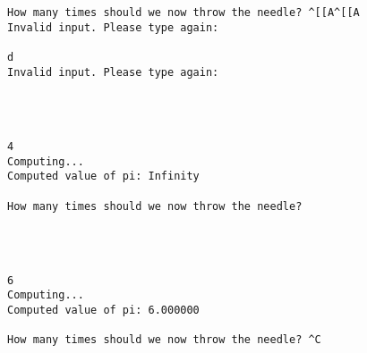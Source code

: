 \documentclass{scrartcl}
\begin{document}
\begin{Verbatim}
How many times should we now throw the needle? ^[[A^[[A
Invalid input. Please type again:  
 
d
Invalid input. Please type again: 




4
Computing...
Computed value of pi: Infinity

How many times should we now throw the needle? 




6
Computing...
Computed value of pi: 6.000000

How many times should we now throw the needle? ^C
\end{Verbatim}
\end{document}
